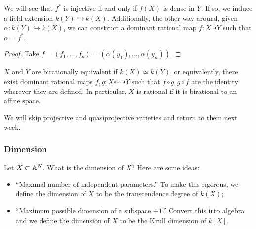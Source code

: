 \documentclass[twoside, 10pt]{article}
\begin{document}
    \begin{prop} We will see that $f^*$ is injective if and only if $f(X)$ is
        dense in $Y$. If so, we induce a field extension $k(Y) \hookrightarrow
        k(X)$.  Additionally, the other way around, given $\alpha: k(Y)
        \hookrightarrow k(X)$, we can construct a dominant rational map $f:X
        \dashrightarrow Y$ such that $\alpha = f^*$.  \begin{proof} Take $f =
        (f_1, \ldots, f_n) = (\alpha(y_1), \ldots, \alpha(y_n))$.  \end{proof}
    \end{prop}

    \begin{defn} $X$ and $Y$ are birationally
        equivalent if $k(X) \simeq k(Y)$, or equivalently, there exist dominant
        rational maps $f,g: X \dashleftarrow \dashrightarrow Y$ such that $f
        \circ g, g \circ f$ are the identity wherever they are defined.  In
    particular, $X$ is rational if it is birational to an affine space.
\end{defn}

    We will skip projective and quasiprojective varieties and return to them
    next week.

    \subsubsection{Dimension} Let $X \subset \mathbb{A}^N$. What is the dimension of
    $X$? Here are some ideas: \begin{itemize} \item ``Maximal number of
        independent parameters.'' To make this rigorous, we define the
        dimension of $X$ to be the transcendence degree of $k(X)$; \item
``Maximum possible dimension of a subspace $+1$.'' Convert this into algebra
and we define the dimension of $X$ to be the Krull dimension of $k[X]$.
\end{itemize}
\end{document}
